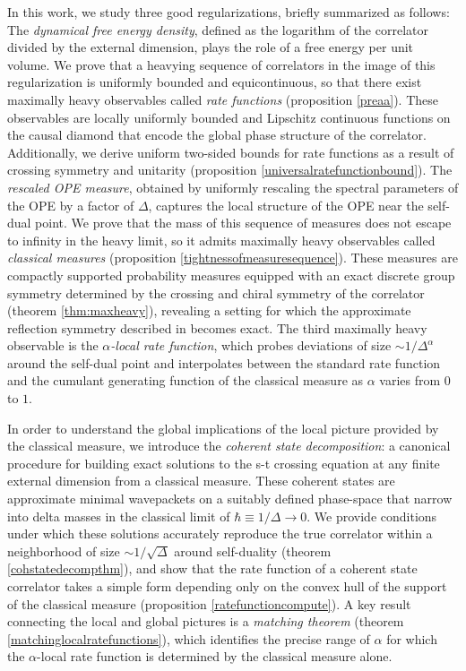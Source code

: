 \documentclass[a4paper,11pt]{article}
\theoremstyle{plain}
\theoremstyle{definition}
\theoremstyle{remark}
\newcommand{\De}{\Delta}
\begin{document}
In this work, we study three good regularizations, briefly summarized as follows: The \textit{dynamical free energy density}, defined as the logarithm of the correlator divided by the external dimension, plays the role of a free energy per unit volume. We prove that a heavying sequence of correlators in the image of this regularization is uniformly bounded and equicontinuous, so that there exist maximally heavy observables called \textit{rate functions} (proposition \ref{preaa}). These observables are locally uniformly bounded and Lipschitz continuous functions on the causal diamond that encode the global phase structure of the correlator. Additionally, we derive uniform two-sided bounds for rate functions as a result of crossing symmetry and unitarity (proposition \ref{universalratefunctionbound}). The \textit{rescaled OPE measure}, obtained by uniformly rescaling the spectral parameters of the OPE by a factor of $\De$, captures the local structure of the OPE near the self-dual point. We prove that the mass of this sequence of measures does not escape to infinity in the heavy limit, so it admits maximally heavy observables called \textit{classical measures} (proposition \ref{tightnessofmeasuresequence}). These measures are compactly supported probability measures equipped with an exact discrete group symmetry determined by the crossing and chiral symmetry of the correlator (theorem \ref{thm:maxheavy}), revealing a setting for which the approximate reflection symmetry described in \cite{Kim2015-sg} becomes exact. The third maximally heavy observable is the \textit{$\alpha$-local rate function}, which probes deviations of size $\sim 1/\De^\alpha$ around the self-dual point and interpolates between the standard rate function and the cumulant generating function of the classical measure as $\alpha$ varies from $0$ to $1$.

In order to understand the global implications of the local picture provided by the classical measure, we introduce the \textit{coherent state decomposition}: a canonical procedure for building exact solutions to the s-t crossing equation at any finite external dimension from a classical measure. These coherent states are approximate minimal wavepackets on a suitably defined phase-space that narrow into delta masses in the classical limit of $\hbar \equiv 1/\De \to 0$. We provide conditions under which these solutions accurately reproduce the true correlator within a neighborhood of size $\sim 1/\sqrt{\De}$ around self-duality (theorem \ref{cohstatedecompthm}), and show that the rate function of a coherent state correlator takes a simple form depending only on the convex hull of the support of the classical measure (proposition \ref{ratefunctioncompute}). A key result connecting the local and global pictures is a \textit{matching theorem} (theorem \ref{matchinglocalratefunctions}), which identifies the precise range of $\alpha$ for which the $\alpha$-local rate function is determined by the classical measure alone.
\end{document}
